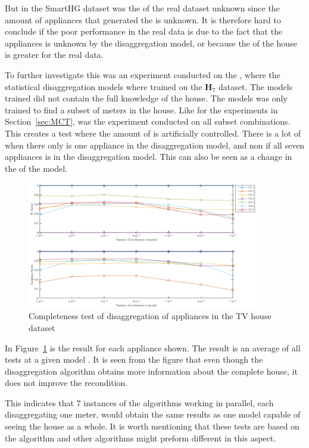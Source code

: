 But in the SmartHG dataset was the  of the real dataset unknown since the amount of appliances that generated the  is unknown. It is therefore hard to conclude if the poor performance in the real data is due to the fact that the appliances is unknown by the disaggregation model, or because the  of the house is greater for the real data. 

To further investigate this was an experiment conducted on the , where the statistical disaggregation models where trained on the $\textbf{H}_{7}$ dataset. The models trained did not contain the full knowledge of the house. The models was only trained to find a subset of meters in the house. Like for the experiments in Section~\ref{sec:MCT}, was the experiment conducted on all subset combinations. This creates a test where the amount of  is artificially controlled. There is a lot of  when there only is one appliance in the disaggregation model, and non if all seven appliances is in the disaggregation model. This can also be seen as a change in the  of the model. 

\begin{figure}[H]
\centering
\includegraphics[width=0.9\textwidth]{billeder/ModelCompletness.png}
\caption{Completeness test of disaggregation of appliances in the TV house dataset }
\label{fig:COD}
\end{figure}

In Figure~\ref{fig:COD} is the result for each appliance shown. The result is an average of all tests at a given model . It is seen from the figure that even though the disaggregation algorithm obtains more information about the complete house, it does not improve the recondition. 

This indicates that 7 instances of the algorithms working in parallel, each disaggregating one meter, would obtain the same results as one model capable of seeing the house as a whole. It is worth mentioning that these tests are based on the  algorithm and other algorithms might preform different in this aspect. 

